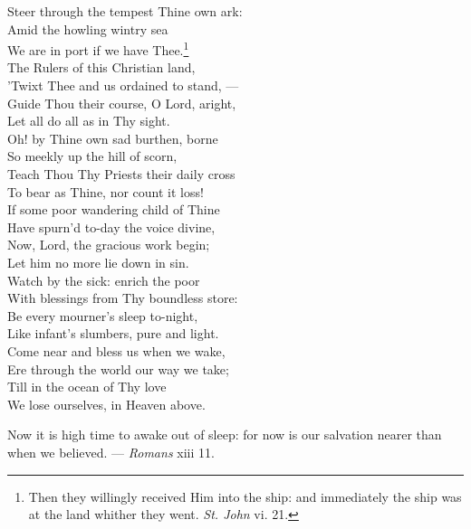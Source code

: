  Steer through the tempest Thine own ark: \\
 Amid the howling wintry sea \\
 We are in port if we have Thee.\footnote{Then they willingly received Him into the ship: and immediately the ship was at the land whither they went. \emph{St. John} vi. 21.} \\
  The Rulers of this Christian land, \\
 ’Twixt Thee and us ordained to stand, — \\
 Guide Thou their course, O Lord, aright, \\
 Let all do all as in Thy sight. \\
  Oh! by Thine own sad burthen, borne \\
 So meekly up the hill of scorn, \\
 Teach Thou Thy Priests their daily cross \\
 To bear as Thine, nor count it loss! \\
  If some poor wandering child of Thine \\
 Have spurn’d to-day the voice divine, \\
 Now, Lord, the gracious work begin; \\
 Let him no more lie down in sin. \\
  Watch by the sick: enrich the poor \\
 With blessings from Thy boundless store: \\
 Be every mourner’s sleep to-night, \\
 Like infant’s slumbers, pure and light. \\
  Come near and bless us when we wake, \\
 Ere through the world our way we take; \\
 Till in the ocean of Thy love \\
 We lose ourselves, in Heaven above.\\


Now it is high time to awake out of sleep: for now is our salvation nearer than when we believed. — \emph{Romans} xiii 11.

